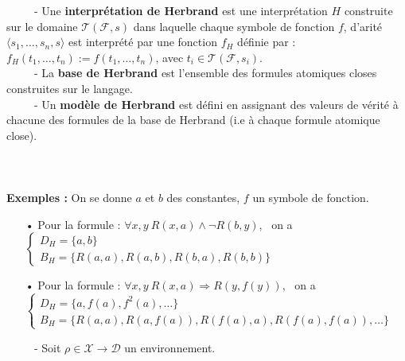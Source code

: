 \documentclass[11pt,a4paper]{article}
\begin{document}
\ \ \ \ \ - Une \textbf{interprétation de Herbrand} est une interprétation $H$ construite sur le domaine $\mathcal{T}(\mathcal{F},s)$ dans laquelle chaque symbole de fonction $f$, d'arité $\langle s_1, \dots,s_n ,s \rangle $ est interprété par une fonction $f_H$ définie par : $f_H(t_1, \dots , t_n) := f(t_1,\dots, t_n)$, avec $t_i \in \mathcal{T}(\mathcal{F},s_i)$. \\

\ \ \ \ \ - La \textbf{base de Herbrand} est l'ensemble des formules atomiques closes construites sur le langage. \\

\ \ \ \ \ - Un \textbf{modèle de Herbrand} est défini en assignant des valeurs de vérité à
chacune des formules de la base de Herbrand (i.e à chaque formule
atomique close). \\ \\ \\ \\

\textbf{Exemples : } 
On se donne $a$ et $b$ des constantes, $f$ un symbole de fonction.
\begin{itemize}
\item[•] Pour la formule : $\forall x ,y \ R(x,a) \land \lnot R(b,y)$, \ on a  $\begin{cases} D_H = \{ a,b \} \\ B_H =\{ R(a,a),R(a,b),R(b,a),R(b,b) \} \end{cases}$
\item[•] Pour la formule : $\forall x,y \ R(x,a) \Rightarrow R(y,f(y))$, \ on a $\begin{cases} D_H = \{ a,f(a),f^2(a), \dots \} \\ B_H =\{ R(a,a),R(a,f(a)),R(f(a),a),R(f(a),f(a)),\dots\} \end{cases}$
\\
\end{itemize} 

\ \ \ \ \ - Soit $\rho \in \mathcal{X} \to \mathcal{D}$ un environnement. \\
\end{document}
